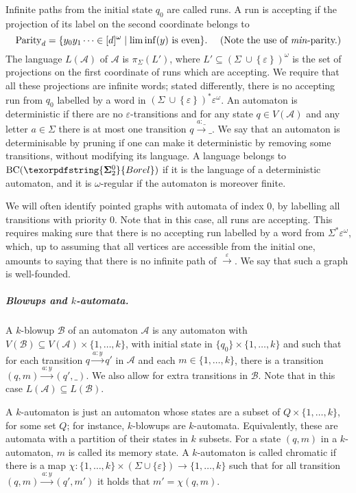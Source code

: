 \documentclass[a4paper,UKenglish,cleveref, thm-restate]{lipics-v2021}
\newcommand{\re}[1]{\xrightarrow{#1}}
\newcommand{\Parity}{\mathrm{Parity}}
\newcommand{\eps}{\varepsilon}
\newcommand{\boldclass}[3]{\texorpdfstring{\ensuremath{\mathbf{#1}^{#2}_{#3}}}{Borel}}
\newcommand{\bsigma}[1]{\boldclass{\Sigma}{0}{#1}}
\newcommand{\A}{\mathcal{A}}
\newcommand{\Sigmaeps}{\Sigma\ {\cup} \left\{\eps\right\}}
\newcommand{\ph}{\_}
\newcommand{\B}{\mathcal B}
\newcommand{\BC}{\text{BC}}
\renewcommand{\d}{[d]}
\begin{document}
Infinite paths from the initial state $q_0$ are called runs. A run is accepting if the projection of its label on the second coordinate belongs to
\[
    \Parity_d = \{y_0y_1 \dots \in \d^\omega \mid \liminf(y) \text{ is even}\}. \quad \text{ (Note the use of \emph{min}-parity.)}
\]
The language $L(\A)$ of $\A$ is $\pi_\Sigma(L')$, where $L' \subseteq (\Sigmaeps)^\omega$ is the set of projections on the first coordinate of runs which are accepting.
We require that all these projections are infinite words; stated differently, there is no accepting run from $q_0$ labelled by a word in $(\Sigmaeps)^* \eps^\omega$.
An automaton is deterministic if there are no $\eps$-transitions and for any state $q \in V(\A)$ and any letter $a \in \Sigma$ there is at most one transition $q \re{a:\ph} \ph$.
We say that an automaton is determinisable by pruning if one can make it deterministic by removing some transitions, without modifying its language.
A language belongs to $\BC(\bsigma 2)$ if it is the language of a deterministic automaton, and it is $\omega$-regular if the automaton is moreover finite.




We will often identify pointed graphs with automata of index $0$, by labelling all transitions with priority $0$. Note that in this case, all runs are accepting.
This requires making sure that there is no accepting run labelled by a word from $\Sigma^* \eps^\omega$, which, up to assuming that all vertices are accessible from the initial one, amounts to saying that there is no infinite path of $\re \eps$.
We say that such a graph is well-founded.


\subparagraph*{Blowups and $k$-automata.} A $k$-blowup $\B$ of an automaton $\A$ is any automaton with $V(\B) \subseteq V(\A) \times \{1,\dots, k\}$, with initial state in $\{q_0\}\times\{1,\dots,k\}$ and such that for each transition $q \re{a:y} q'$ in $\A$ and each $m \in \{1,\dots,k\}$, there is a transition $(q,m) \re{a:y} (q',\ph)$. We also allow for extra transitions in $\B$. Note that in this case $L(\A) \subseteq L(\B)$.

A $k$-automaton is just an automaton whose states are a subset of $Q \times \{1,\dots,k\}$, for some set $Q$; for instance, $k$-blowups are $k$-automata.
Equivalently, these are automata with a partition of their states in $k$ subsets.
For a state $(q,m)$ in a $k$-automaton, $m$ is called its memory state.
A $k$-automaton is called chromatic if there is a map $\chi:  \{1,\dots, k\} \times (\Sigma \cup \{\eps\}) \to  \{1,\dots, k\}$ such that for all transition $(q,m) \re{a:y} (q',m')$ it holds that $m'=\chi(q,m)$.
\end{document}
